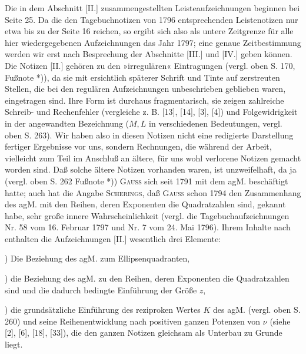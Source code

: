 \par\indent Die in dem Abschnitt [II.] zusammengestellten Leisteaufzeichnungen beginnen bei Seite 25. Da die den Tagebuchnotizen von 1796 entsprechenden Leistenotizen nur etwa bis zu der Seite 16 reichen, so ergibt sich also als untere Zeitgrenze für alle hier wiedergegebenen Aufzeichnungen das Jahr 1797; eine genaue Zeitbestimmung werden wir erst nach Besprechung der Abschnitte [III.] und [IV.] geben können. Die Notizen [II.] gehören zu den »irregulären« Eintragungen (vergl. oben S. 170, Fußnote *)), da sie mit ersichtlich späterer Schrift und Tinte auf zerstreuten Stellen, die bei den regulären Aufzeichnungen unbeschrieben geblieben waren, eingetragen sind. Ihre Form ist durchaus fragmentarisch, sie zeigen zahlreiche Schreib- und Rechenfehler (vergleiche z. B. [13], [14], [3], [4]) und Folgewidrigkeit in der angewandten Bezeichnung ($M,L$ in verschiedenen Bedeutungen, vergl. oben S. 263). Wir haben also in diesen Notizen nicht eine redigierte Darstellung fertiger Ergebnisse vor uns, sondern Rechnungen, die während der Arbeit, vielleicht zum Teil im Anschluß an ältere, für uns wohl verlorene Notizen gemacht worden sind. Daß solche ältere Notizen vorhanden waren, ist unzweifelhaft, da ja (vergl. oben S. 262 Fußnote *)) \textsc{Gauss} sich seit 1791 mit dem agM. beschäftigt hatte; auch hat die Angabe \textsc{Scherings}, daß \textsc{Gauss} schon 1794 den Zusammenhang des agM. mit den Reihen, deren Exponenten die Quadratzahlen sind, gekannt habe, sehr große innere Wahrscheinlichkeit (vergl. die Tagebuchaufzeichnungen Nr. 58 vom 16. Februar 1797 und Nr. 7 vom 24. Mai 1796). Ihrem Inhalte nach enthalten die Aufzeichnungen [II.] wesentlich drei Elemente:
\par{}) Die Beziehung des agM. zum Ellipsenquadranten,
\par{}) die Beziehung des agM. zu den Reihen, deren Exponenten die Quadratzahlen sind und die dadurch bedingte Einführung der Größe $z$,
\par{}) die grundsätzliche Einführung des reziproken Wertes $K$ des agM. (vergl. oben S. 260) und seine Reihenentwicklung nach positiven ganzen Potenzen von $\nu$ (siehe [2], [6], [18], [33]), die den ganzen Notizen gleichsam als Unterbau zu Grunde liegt.
\clearpage
\endgroup

